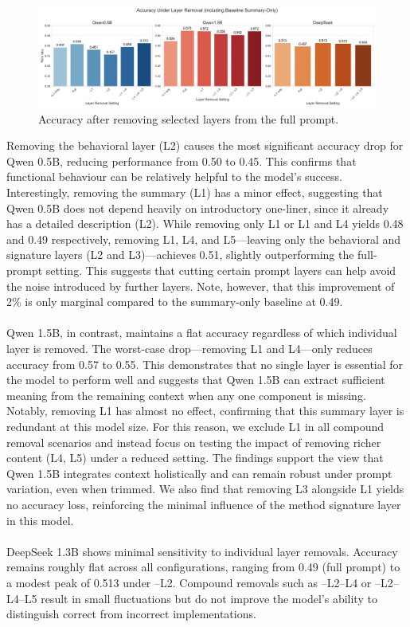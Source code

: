 \documentclass[a4paper]{usiinfbachelorproject}
\begin{document}
\begin{figure}[H]\centering
  \includegraphics[width=\linewidth]{./figures/ablation_accuracy_subfigs.png}
  \caption{Accuracy after removing selected layers from the full prompt.}
  \label{fig:ablation-accuracy}
\end{figure}
\noindent
Removing the behavioral layer (L2) causes the most significant accuracy drop for Qwen 0.5B, reducing performance from 0.50 to 0.45. This confirms that functional behaviour can be relatively helpful to the model's success. Interestingly, removing the summary (L1) has a minor effect, suggesting that Qwen 0.5B does not depend heavily on introductory one-liner, since it already has a detailed description (L2). While removing only L1 or L1 and L4 yields 0.48 and 0.49 respectively, removing L1, L4, and L5—leaving only the behavioral and signature layers (L2 and L3)—achieves 0.51, slightly outperforming the full-prompt setting. This suggests that cutting certain prompt layers can help avoid the noise introduced by further layers. Note, however, that this improvement of 2\% is only marginal compared to the summary-only baseline at 0.49. \\
\\
Qwen 1.5B, in contrast, maintains a flat accuracy regardless of which individual layer is removed. The worst-case drop—removing L1 and L4—only reduces accuracy from 0.57 to 0.55. This demonstrates that no single layer is essential for the model to perform well and suggests that Qwen 1.5B can extract sufficient meaning from the remaining context when any one component is missing. Notably, removing L1 has almost no effect, confirming that this summary layer is redundant at this model size. For this reason, we exclude L1 in all compound removal scenarios and instead focus on testing the impact of removing richer content (L4, L5) under a reduced setting. The findings support the view that Qwen 1.5B integrates context holistically and can remain robust under prompt variation, even when trimmed. We also find that removing L3 alongside L1 yields no accuracy loss, reinforcing the minimal influence of the method signature layer in this model. \\
\\
DeepSeek 1.3B shows minimal sensitivity to individual layer removals. Accuracy remains roughly flat across all configurations, ranging from 0.49 (full prompt) to a modest peak of 0.513 under –L2. Compound removals such as –L2–L4 or –L2–L4–L5 result in small fluctuations but do not improve the model’s ability to distinguish correct from incorrect implementations.
\end{document}
